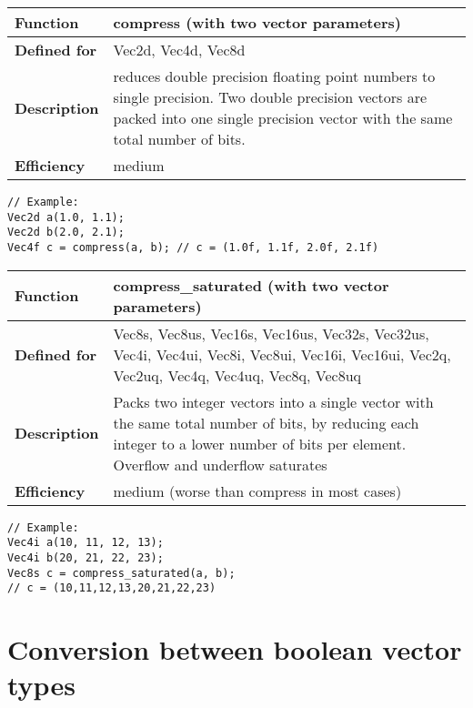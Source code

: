 \documentclass[vcl_manual.tex]{subfiles}
\begin{document}
\begin{tabular}{|p{30mm}|p{120mm}|}
\hline
\bfseries Function & compress (with two vector parameters)\\ \hline
\bfseries Defined for & Vec2d, Vec4d, Vec8d \\ \hline
\bfseries Description & reduces double precision floating point numbers to single precision. Two double precision vectors are packed into one single precision vector with the same total number of bits. \\ \hline
\bfseries Efficiency & medium \\ \hline
\end{tabular}
\begin{lstlisting}[frame=none]
// Example:
Vec2d a(1.0, 1.1);
Vec2d b(2.0, 2.1);
Vec4f c = compress(a, b); // c = (1.0f, 1.1f, 2.0f, 2.1f)
\end{lstlisting}


\begin{tabular}{|p{30mm}|p{120mm}|}
\hline
\bfseries Function & compress\_saturated (with two vector parameters) \\ \hline
\bfseries Defined for & Vec8s, Vec8us, Vec16s, Vec16us, Vec32s, Vec32us, 
Vec4i, Vec4ui, Vec8i, Vec8ui, Vec16i, Vec16ui,  
Vec2q, Vec2uq, Vec4q, Vec4uq, Vec8q, Vec8uq \\ \hline

\bfseries Description & Packs two integer vectors into a single vector with the same total number of bits, by reducing each integer to a lower number of bits per element. 
Overflow and underflow saturates \\ \hline
\bfseries Efficiency & medium (worse than compress in most cases) \\ \hline
\end{tabular}
\begin{lstlisting}[frame=none]
// Example:
Vec4i a(10, 11, 12, 13);
Vec4i b(20, 21, 22, 23);
Vec8s c = compress_saturated(a, b);
// c = (10,11,12,13,20,21,22,23)
\end{lstlisting}


\section{Conversion between boolean vector types}\label{ConversionBetweenBooleanTypes}
\end{document}
